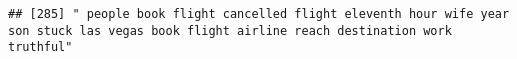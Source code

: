\documentclass[
]{article}
\begin{document}
\begin{verbatim}
## [285] " people book flight cancelled flight eleventh hour wife year son stuck las vegas book flight airline reach destination work truthful"                                                                                                                                                                                                                                                                                                                                                                                                                                                                                                                                                                                                                                                                                                                                                                                                                                                                                                                                                                                                                                                                                                                                                                                                                                                                                                                                                                                                                                                                                                                                                                                                                                                          

\end{verbatim}
\end{document}
